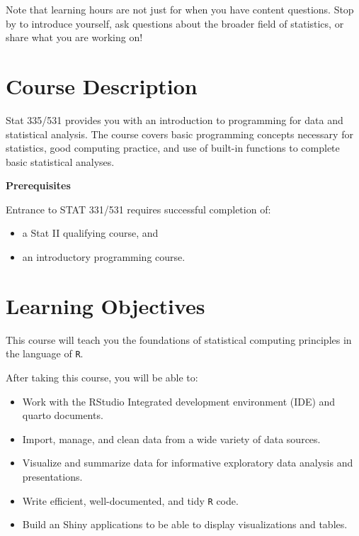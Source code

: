 \documentclass[
  11pt,
  letterpaper,
  DIV=11,
  numbers=noendperiod]{scrartcl}
\providecommand{\tightlist}{%
  \setlength{\itemsep}{0pt}\setlength{\parskip}{0pt}}\usepackage{longtable,booktabs,array}
\begin{document}
Note that learning hours are not just for when you have content
questions. Stop by to introduce yourself, ask questions about the
broader field of statistics, or share what you are working on!

\hypertarget{course-description}{%
\section{Course Description}\label{course-description}}

Stat 335/531 provides you with an introduction to programming for data
and statistical analysis. The course covers basic programming concepts
necessary for statistics, good computing practice, and use of built-in
functions to complete basic statistical analyses.

\textbf{Prerequisites}

Entrance to STAT 331/531 requires successful completion of:

\begin{itemize}
\tightlist
\item
  a Stat II qualifying course, and
\item
  an introductory programming course.
\end{itemize}

\hypertarget{learning-objectives}{%
\section{Learning Objectives}\label{learning-objectives}}

This course will teach you the foundations of statistical computing
principles in the language of \texttt{R}.

After taking this course, you will be able to:

\begin{itemize}
\tightlist
\item
  Work with the RStudio Integrated development environment (IDE) and
  quarto documents.
\item
  Import, manage, and clean data from a wide variety of data sources.
\item
  Visualize and summarize data for informative exploratory data analysis
  and presentations.
\item
  Write efficient, well-documented, and tidy \texttt{R} code.
\item
  Build an Shiny applications to be able to display visualizations and
  tables.
\end{itemize}
\end{document}
